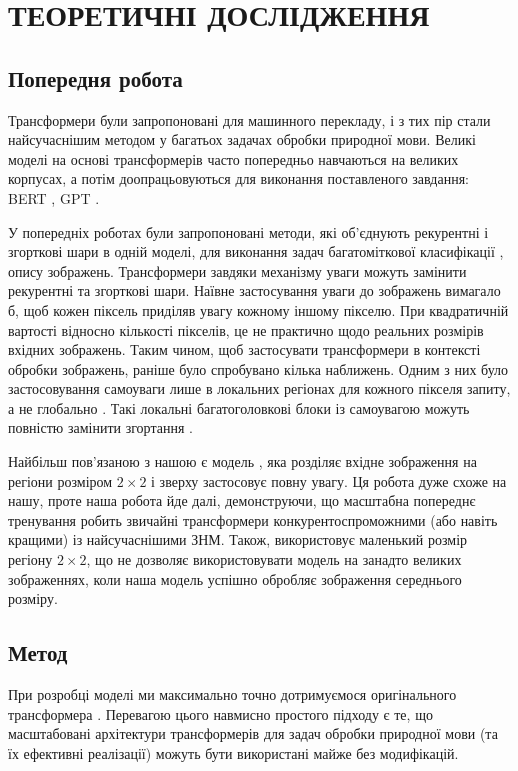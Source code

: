 \chapter[Теоретичні дослідження]{ТЕОРЕТИЧНІ ДОСЛІДЖЕННЯ}
\section{Попередня робота}
Трансформери були запропоновані \cite{attention-all-need}
для машинного перекладу, і з тих пір стали
найсучаснішим методом у багатьох задачах обробки природної
мови. Великі моделі на основі трансформерів
часто попередньо навчаються на великих корпусах, а потім
доопрацьовуються для виконання поставленого завдання:
BERT \cite{bert}, GPT \cite{gpt}.

У попередніх роботах були запропоновані методи, які об'єднують
рекурентні і згорткові шари в одній моделі, для виконання задач
багатоміткової класифікації \cite{nn:cnn-rnn}, опису зображень.
Трансформери завдяки механізму уваги можуть
замінити рекурентні та згорткові шари. Наївне застосування
уваги до зображень вимагало б, щоб кожен піксель приділяв
увагу кожному іншому пікселю. При квадратичній вартості відносно кількості
пікселів, це не практично щодо реальних розмірів
вхідних зображень. Таким чином, щоб застосувати
трансформери в контексті обробки зображень,
раніше було спробувано кілька наближень. Одним з них
було застосовування самоуваги лише в локальних
регіонах для кожного пікселя запиту, а не глобально \cite{image-trans}.
Такі локальні багатоголовкові блоки із самоувагою
можуть повністю замінити згортання \cite{local-regions-attention}.

Найбільш пов’язаною з нашою є модель \cite{cordonnier},
яка розділяє вхідне зображення на регіони розміром
$2 \times 2$ і зверху застосовує повну увагу. Ця робота
дуже схоже на нашу, проте наша робота йде далі,
демонструючи, що масштабна попереднє тренування
робить звичайні трансформери
конкурентоспроможними (або навіть кращими) із найсучаснішими ЗНМ.
Також, \cite{cordonnier} використовує маленький розмір
регіону $2 \times 2$, що не дозволяє використовувати модель
на занадто великих зображеннях, коли наша модель успішно обробляє
зображення середнього розміру.

\section{Метод}

При розробці моделі ми максимально точно дотримуємося
оригінального трансформера \cite{attention-all-need}.
Перевагою цього навмисно простого підходу
є те, що масштабовані архітектури трансформерів
для задач обробки природної мови (та їх ефективні реалізації)
можуть бути використані майже без модифікацій.

